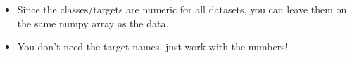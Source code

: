 \documentclass[11pt]{article}
\providecommand{\tightlist}{%
      \setlength{\itemsep}{0pt}\setlength{\parskip}{0pt}}
\begin{document}
    \begin{itemize}
\tightlist
\item
  Since the classes/targets are numeric for all datasets, you can leave
  them on the same numpy array as the data.
\end{itemize}

    \begin{itemize}
\tightlist
\item
  You don't need the target names, just work with the numbers!
\end{itemize}


    
    
    
    
\end{document}
